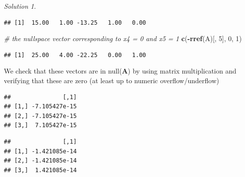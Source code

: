 \documentclass[
]{book}
\newenvironment{Shaded}{\begin{snugshade}}{\end{snugshade}}
\newcommand{\CommentTok}[1]{\textcolor[rgb]{0.56,0.35,0.01}{\textit{#1}}}
\newcommand{\DecValTok}[1]{\textcolor[rgb]{0.00,0.00,0.81}{#1}}
\newcommand{\KeywordTok}[1]{\textcolor[rgb]{0.13,0.29,0.53}{\textbf{#1}}}
\newcommand{\NormalTok}[1]{#1}
\newcommand{\OperatorTok}[1]{\textcolor[rgb]{0.81,0.36,0.00}{\textbf{#1}}}
\newcommand{\StringTok}[1]{\textcolor[rgb]{0.31,0.60,0.02}{#1}}
\theoremstyle{definition}
\theoremstyle{definition}
\theoremstyle{definition}
\theoremstyle{remark}
\newtheorem*{solution}{Solution}
\begin{document}
\begin{solution}
\begin{verbatim}
## [1]  15.00   1.00 -13.25   1.00   0.00
\end{verbatim}

\begin{Shaded}
\begin{Highlighting}[]
\CommentTok{# the nullspace vector corresponding to x4 = 0 and x5 = 1}
\KeywordTok{c}\NormalTok{(}\OperatorTok{-}\KeywordTok{rref}\NormalTok{(A)[, }\DecValTok{5}\NormalTok{], }\DecValTok{0}\NormalTok{, }\DecValTok{1}\NormalTok{)}
\end{Highlighting}
\end{Shaded}

\begin{verbatim}
## [1]  25.00   4.00 -22.25   0.00   1.00
\end{verbatim}

We check that these vectors are in null(\(\mathbf{A}\)) by using matrix multiplication and verifying that these are zero (at least up to numeric overflow/underflow)

\begin{Shaded}
\end{Shaded}

\begin{verbatim}
##               [,1]
## [1,] -7.105427e-15
## [2,] -7.105427e-15
## [3,]  7.105427e-15
\end{verbatim}

\begin{Shaded}
\end{Shaded}

\begin{verbatim}
##               [,1]
## [1,] -1.421085e-14
## [2,] -1.421085e-14
## [3,]  1.421085e-14
\end{verbatim}

\end{solution}
\end{document}
